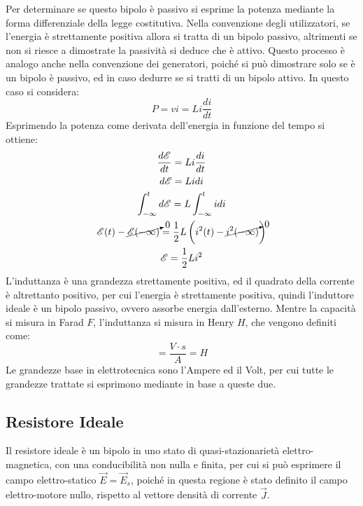 \documentclass{article}
\numberwithin{equation}{subsection}
\begin{document}
Per determinare se questo bipolo è passivo si esprime la potenza mediante la forma differenziale della legge costitutiva. Nella convenzione degli utilizzatori, se l'energia 
è strettamente positiva allora si tratta di un bipolo passivo, altrimenti se non si riesce a dimostrate la passività si deduce che è attivo. Questo processo è analogo 
anche nella convenzione dei generatori, poiché si può dimostrare solo se è un bipolo è passivo, ed in caso dedurre se si tratti di un bipolo attivo. In questo caso si 
considera:
\begin{equation*}
    P=vi=Li\displaystyle\frac{di}{dt}
\end{equation*}
Esprimendo la potenza come derivata dell'energia in funzione del tempo si ottiene:
\begin{gather*}
    \displaystyle\frac{d\mathscr{E}}{dt}=Li\frac{di}{dt}\\
    d\mathscr{E}=Lidi\\
    \displaystyle\int_{-\infty}^td\mathscr{E}=L\int_{-\infty}^tidi\\
    \mathscr{E}(t)-\cancelto{0}{\mathscr{E}(-\infty)}=\displaystyle\frac{1}{2}L\left(i^2(t)-\cancelto{0}{i^2(-\infty)}\right)\\
    \mathscr{E}=\displaystyle\frac{1}{2}Li^2
\end{gather*}
L'induttanza è una grandezza strettamente positiva, ed il quadrato della corrente è altrettanto positivo, per cui l'energia è strettamente positiva, quindi l'induttore ideale 
è un bipolo passivo, ovvero assorbe energia dall'esterno. 
Mentre la capacità si misura in Farad $F$, l'induttanza si misura in Henry $H$, che vengono definiti come:
\begin{equation*}
    [L]=\displaystyle\frac{V\cdot s}{A}=H
\end{equation*}
Le grandezze base in elettrotecnica sono l'Ampere ed il Volt, per cui tutte le grandezze trattate si esprimono mediante in base a queste due. 

\subsection{Resistore Ideale}

Il resistore ideale è un bipolo in uno stato di quasi-stazionarietà elettro-magnetica, con una conducibilità non nulla e finita, per cui si può esprimere il campo 
elettro-statico $\vec{E}=\vec{E}_s$, poiché in questa regione è stato definito il campo elettro-motore nullo, rispetto al vettore densità di corrente $\vec{J}$.
\end{document}
